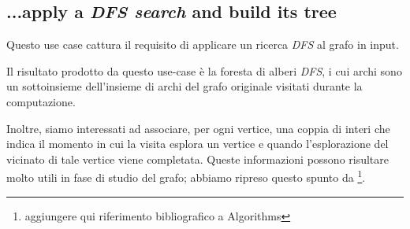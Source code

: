 \subsection{...apply a \emph{DFS search} and build its tree}
Questo use case cattura il requisito di applicare un ricerca
\emph{DFS} al grafo in input.

Il risultato prodotto da questo use-case \`e la foresta di alberi
\emph{DFS}, i cui archi sono un sottoinsieme dell'insieme di archi del
grafo originale visitati durante la computazione.

Inoltre, siamo interessati ad associare, per ogni vertice, una coppia
di interi che indica il momento in cui la visita esplora un vertice e
quando l'esplorazione del vicinato di tale vertice viene
completata. Queste informazioni possono risultare molto utili in fase
di studio del grafo; abbiamo ripreso questo spunto da
\footnote{aggiungere qui riferimento bibliografico a Algorithms}.

